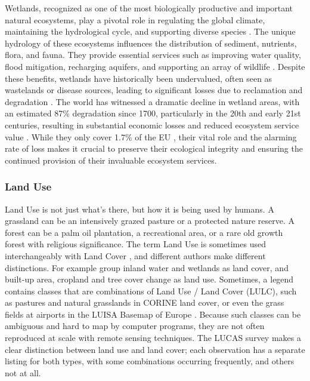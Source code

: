        Wetlands, recognized as one of the most biologically productive and important natural ecosystems, play a pivotal role in regulating the global climate, maintaining the hydrological cycle, and supporting diverse species \citep{hu2017global,ramsar2001wetlands}. The unique hydrology of these ecosystems influences the distribution of sediment, nutrients, flora, and fauna. They provide essential services such as improving water quality, flood mitigation, recharging aquifers, and supporting an array of wildlife \citep{costanza1997value,smardon2009sustaining}. Despite these benefits, wetlands have historically been undervalued, often seen as wastelands or disease sources, leading to significant losses due to reclamation and degradation \citep{giblett1996postmodern,owens2001global,davidson2014much,gardner2018global,dugan1993wetlands,oecd1996guidelines,ramsar2015wetlands}. The world has witnessed a dramatic decline in wetland areas, with an estimated 87\% degradation since 1700, particularly in the 20th and early 21st centuries, resulting in substantial economic losses and reduced ecosystem service value \citep{gardner2015state,costanza2014changes}. While they only cover 1.7\% of the EU \citep{eurostat2021land}, their vital role and the alarming rate of loss makes it crucial to preserve their ecological integrity and ensuring the continued provision of their invaluable ecosystem services.

    \subsubsection{Land Use}

        Land Use is not just what's there, but how it is being used by humans. A grassland can be an intensively grazed pasture or a protected nature reserve. A forest can be a palm oil plantation, a recreational area, or a rare old growth forest with religious significance. The term Land Use is sometimes used interchangeably with Land Cover \citep{fisher2005land}, and different authors make different distinctions. For example \citet{hansen2022global} group inland water and wetlands as land cover, and built-up area, cropland and tree cover change as land use. Sometimes, a legend contains classes that are combinations of Land Use / Land Cover (LULC), such as pastures and natural grasslands in CORINE land cover, or even the grass fields at airports in the LUISA Basemap of Europe \citep{pigaiani2021luisa}. Because such classes can be ambiguous and hard to map by computer programs, they are not often reproduced at scale with remote sensing techniques. The LUCAS survey makes a clear distinction between land use and land cover; each observation has a separate listing for both types, with some combinations occurring frequently, and others not at all.

